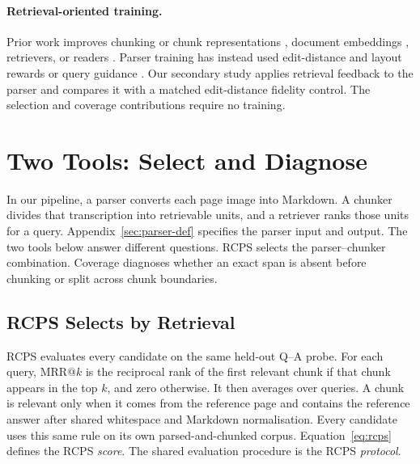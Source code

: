 \documentclass[11pt]{article}
\newcommand{\rcps}{\textnormal{\textsc{RCPS}}}
\begin{document}
\paragraph{Retrieval-oriented training.} Prior work improves chunking or chunk representations \citep{jina2024late,duarte2024lumber,zhao2024meta,zhao2025moc,singh2024chunkrag}, document embeddings \citep{conti2025insent,zhao2025lmar}, retrievers, or readers \citep{nguyen2024rewardrag,chia2025mlongdoc,yan2025rpo}. Parser training has instead used edit-distance and layout rewards \citep{infinity_parser} or query guidance \citep{agenticocr}. Our secondary study applies retrieval feedback to the parser and compares it with a matched edit-distance fidelity control. The selection and coverage contributions require no training.

\section{Two Tools: Select and Diagnose}

In our pipeline, a parser converts each page image into Markdown. A chunker divides that transcription into retrievable units, and a retriever ranks those units for a query. Appendix~\ref{sec:parser-def} specifies the parser input and output. The two tools below answer different questions. \rcps{} selects the parser--chunker combination. Coverage diagnoses whether an exact span is absent before chunking or split across chunk boundaries.

\subsection{\rcps{} Selects by Retrieval}
\label{sec:rcps}

\rcps{} evaluates every candidate on the same held-out Q--A probe. For each query, MRR@$k$ is the reciprocal rank of the first relevant chunk if that chunk appears in the top $k$, and zero otherwise. It then averages over queries. A chunk is relevant only when it comes from the reference page and contains the reference answer after shared whitespace and Markdown normalisation. Every candidate uses this same rule on its own parsed-and-chunked corpus. Equation~\ref{eq:rcps} defines the \rcps{} \emph{score}. The shared evaluation procedure is the \rcps{} \emph{protocol}.
\end{document}

